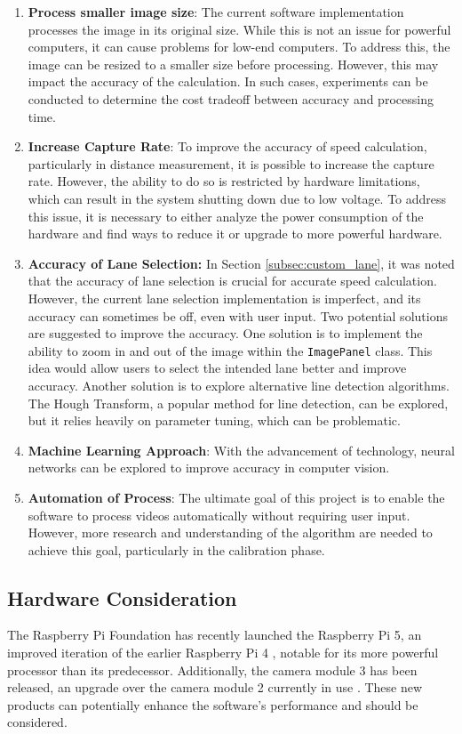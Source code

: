 \begin{enumerate}
    \item \textbf{Process smaller image size}: The current software implementation processes the image in its original size. While this is not an issue for powerful computers, it can cause problems for low-end computers. To address this, the image can be resized to a smaller size before processing. However, this may impact the accuracy of the calculation. In such cases, experiments can be conducted to determine the cost tradeoff between accuracy and processing time.
    \item \textbf{Increase Capture Rate}: To improve the accuracy of speed calculation, particularly in distance measurement, it is possible to increase the capture rate. However, the ability to do so is restricted by hardware limitations, which can result in the system shutting down due to low voltage. To address this issue, it is necessary to either analyze the power consumption of the hardware and find ways to reduce it or upgrade to more powerful hardware.
    \item \textbf{Accuracy of Lane Selection:} In Section \ref{subsec:custom_lane}, it was noted that the accuracy of lane selection is crucial for accurate speed calculation. However, the current lane selection implementation is imperfect, and its accuracy can sometimes be off, even with user input. Two potential solutions are suggested to improve the accuracy. One solution is to implement the ability to zoom in and out of the image within the \texttt{ImagePanel} class. This idea would allow users to select the intended lane better and improve accuracy. Another solution is to explore alternative line detection algorithms. The Hough Transform, a popular method for line detection, can be explored, but it relies heavily on parameter tuning, which can be problematic.
    \item \textbf{Machine Learning Approach}: With the advancement of technology, neural networks can be explored to improve accuracy in computer vision.
    \item \textbf{Automation of Process}: The ultimate goal of this project is to enable the software to process videos automatically without requiring user input. However, more research and understanding of the algorithm are needed to achieve this goal, particularly in the calibration phase.
\end{enumerate}

\subsection{Hardware Consideration}

The Raspberry Pi Foundation has recently launched the Raspberry Pi 5, an improved iteration of the earlier Raspberry Pi 4 \cite{RaspberryPi5}, notable for its more powerful processor than its predecessor. Additionally, the camera module 3 has been released, an upgrade over the camera module 2 currently in use \cite{picamera_2023}. These new products can potentially enhance the software's performance and should be considered.